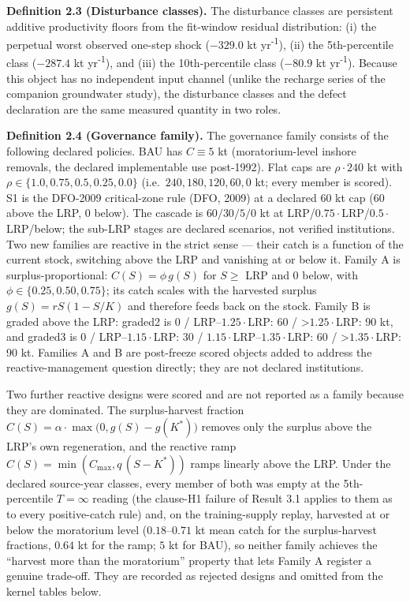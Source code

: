 \documentclass[11pt]{article}
\begin{document}
\textbf{Definition 2.3 (Disturbance classes).} The disturbance classes
are persistent additive productivity floors from the fit-window residual
distribution: (i) the perpetual worst observed one-step shock
(\(-329.0\) kt yr\textsuperscript{-1}), (ii) the 5th-percentile class (\(-287.4\) kt
yr\textsuperscript{-1}), and (iii) the 10th-percentile class (\(-80.9\) kt yr\textsuperscript{-1}). Because
this object has no independent input channel (unlike the recharge series
of the companion groundwater study), the disturbance classes and the
defect declaration are the same measured quantity in two roles.

\textbf{Definition 2.4 (Governance family).} The governance family
consists of the following declared policies. BAU has \(C \equiv 5\) kt
(moratorium-level inshore removals, the declared implementable use
post-1992). Flat caps are \(\rho \cdot 240\) kt with
\(\rho \in \{1.0, 0.75, 0.5, 0.25, 0.0\}\)
(i.e.~\(240, 180, 120, 60, 0\) kt; every member is scored). S1 is the
DFO-2009 critical-zone rule (DFO, 2009) at a declared \(60\) kt cap
(\(60\) above the LRP, \(0\) below). The cascade is \(60/30/5/0\) kt at
LRP/\(0.75\cdot\)LRP/\(0.5\cdot\)LRP/below; the sub-LRP stages are
declared scenarios, not verified institutions. Two new families are
reactive in the strict sense --- their catch is a function of the
current stock, switching above the LRP and vanishing at or below it.
Family A is surplus-proportional: \(C(S) = \phi\, g(S)\) for \(S \ge\)
LRP and 0 below, with \(\phi \in \{0.25, 0.50, 0.75\}\); its catch
scales with the harvested surplus \(g(S) = rS(1 - S/K)\) and therefore
feeds back on the stock. Family B is graded above the LRP: graded2 is 0
/ LRP--\(1.25\cdot\)LRP: 60 / \textgreater{}\(1.25\cdot\)LRP: 90 kt, and
graded3 is 0 / LRP--\(1.15\cdot\)LRP: 30 /
\(1.15\cdot\)LRP--\(1.35\cdot\)LRP: 60 / \textgreater{}\(1.35\cdot\)LRP:
90 kt. Families A and B are post-freeze scored objects added to address
the reactive-management question directly; they are not declared
institutions.

Two further reactive designs were scored and are not reported as a
family because they are dominated. The surplus-harvest fraction
\(C(S) = \alpha\cdot\max\bigl(0, g(S) - g(K^*)\bigr)\) removes only the
surplus above the LRP's own regeneration, and the reactive ramp
\(C(S) = \min(C_{\max}, q\,(S - K^*))\) ramps linearly above the LRP.
Under the declared source-year classes, every member of both was empty
at the 5th-percentile \(T=\infty\) reading (the clause-H1 failure of
Result 3.1 applies to them as to every positive-catch rule) and, on the
training-supply replay, harvested at or below the moratorium level
(\(0.18\)--\(0.71\) kt mean catch for the surplus-harvest fractions,
\(0.64\) kt for the ramp; \(5\) kt for BAU), so neither family achieves
the ``harvest more than the moratorium'' property that lets Family A
register a genuine trade-off. They are recorded as rejected designs and
omitted from the kernel tables below.
\end{document}
